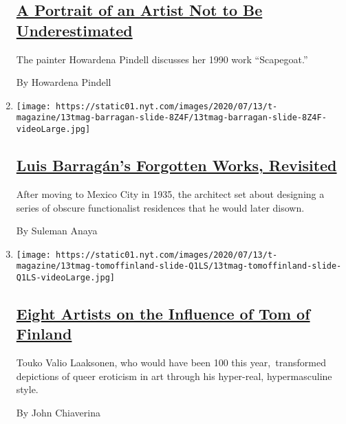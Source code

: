 \begin{enumerate}
  \hypertarget{a-portrait-of-an-artist-not-to-be-underestimated}{%
  \subsection{\texorpdfstring{\href{/2020/07/24/t-magazine/howardena-pindell.html}{A
  Portrait of an Artist Not to Be
  Underestimated}}{A Portrait of an Artist Not to Be Underestimated}}\label{a-portrait-of-an-artist-not-to-be-underestimated}}

  The painter Howardena Pindell discusses her 1990 work ``Scapegoat.''

  By Howardena Pindell
\item
  \texttt{[image: https://static01.nyt.com/images/2020/07/13/t-magazine/13tmag-barragan-slide-8Z4F/13tmag-barragan-slide-8Z4F-videoLarge.jpg]}

  \hypertarget{luis-barraguxe1ns-forgotten-works-revisited-1}{%
  \subsection{\texorpdfstring{\href{/2020/07/24/t-magazine/luis-barragan.html}{Luis
  Barragán's Forgotten Works,
  Revisited}}{Luis Barragán's Forgotten Works, Revisited}}\label{luis-barraguxe1ns-forgotten-works-revisited-1}}

  After moving to Mexico City in 1935, the architect set about designing
  a series of obscure functionalist residences that he would later
  disown.

  By Suleman Anaya
\item
  \texttt{[image: https://static01.nyt.com/images/2020/07/13/t-magazine/13tmag-tomoffinland-slide-Q1LS/13tmag-tomoffinland-slide-Q1LS-videoLarge.jpg]}

  \hypertarget{eight-artists-on-the-influence-of-tom-of-finland}{%
  \subsection{\texorpdfstring{\href{/2020/07/23/t-magazine/tom-of-finland.html}{Eight
  Artists on the Influence of Tom of
  Finland}}{Eight Artists on the Influence of Tom of Finland}}\label{eight-artists-on-the-influence-of-tom-of-finland}}

  Touko Valio Laaksonen, who would have been 100 this year,~transformed
  depictions of queer eroticism in art through his hyper-real,
  hypermasculine style.

  By John Chiaverina
\end{enumerate}

